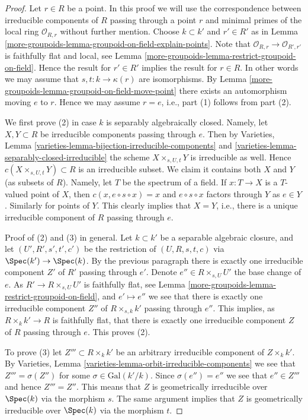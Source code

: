 \begin{proof}
Let $r \in R$ be a point.
In this proof we will use the correspondence between irreducible components
of $R$ passing through a point $r$ and minimal primes of the local
ring $\mathcal{O}_{R, r}$ without further mention.
Choose $k \subset k'$ and $r' \in R'$ as in
Lemma \ref{more-groupoids-lemma-groupoid-on-field-explain-points}.
Note that $\mathcal{O}_{R, r} \to \mathcal{O}_{R', r'}$
is faithfully flat and local, see
Lemma \ref{more-groupoids-lemma-restrict-groupoid-on-field}.
Hence the result for $r' \in R'$ implies the result for $r \in R$.
In other words we may assume that $s, t : k \to \kappa(r)$
are isomorphisms. By
Lemma \ref{more-groupoids-lemma-groupoid-on-field-move-point}
there exists an automorphism moving $e$ to $r$.
Hence we may assume $r = e$, i.e., part (1) follows from part (2).

\medskip\noindent
We first prove (2) in case $k$ is separably algebraically closed.
Namely, let $X, Y \subset R$ be irreducible components
passing through $e$. Then by
Varieties, Lemma \ref{varieties-lemma-bijection-irreducible-components} and
\ref{varieties-lemma-separably-closed-irreducible}
the scheme $X \times_{s, U, t} Y$ is irreducible as well.
Hence $c(X \times_{s, U, t} Y) \subset R$ is an irreducible subset.
We claim it contains both $X$ and $Y$ (as subsets of $R$).
Namely, let $T$ be the spectrum of a field. If $x : T \to X$ is a $T$-valued
point of $X$, then $c(x, e \circ s \circ x) = x$ and $e \circ s \circ x$
factors through $Y$ as $e \in Y$. Similarly for points of $Y$.
This clearly implies that $X = Y$, i.e., there is a unique irreducible
component of $R$ passing through $e$.

\medskip\noindent
Proof of (2) and (3) in general.
Let $k \subset k'$ be a separable algebraic closure, and
let $(U', R', s', t', c')$ be the restriction of
$(U, R, s, t, c)$ via $\Spec(k') \to \Spec(k)$.
By the previous paragraph there is exactly one irreducible
component $Z'$ of $R'$ passing through $e'$.
Denote $e'' \in R \times_{s, U} U'$ the base change of $e$.
As $R' \to R \times_{s, U} U'$ is faithfully flat, see
Lemma \ref{more-groupoids-lemma-restrict-groupoid-on-field},
and $e' \mapsto e''$ we see that there is exactly one
irreducible component $Z''$ of $R \times_{s, k} k'$ passing
through $e''$. This implies, as $R \times_k k' \to R$ is faithfully
flat, that there is exactly one irreducible component $Z$ of $R$
passing through $e$. This proves (2).

\medskip\noindent
To prove (3) let $Z''' \subset R \times_k k'$ be an arbitrary
irreducible component of $Z \times_k k'$. By
Varieties, Lemma \ref{varieties-lemma-orbit-irreducible-components}
we see that $Z''' = \sigma(Z'')$ for some $\sigma \in \text{Gal}(k'/k)$.
Since $\sigma(e'') = e''$ we see that $e'' \in Z'''$ and hence
$Z''' = Z''$. This means that $Z$ is geometrically irreducible
over $\Spec(k)$ via the morphism $s$.
The same argument implies that $Z$ is geometrically irreducible
over $\Spec(k)$ via the morphism $t$.
\end{proof}

